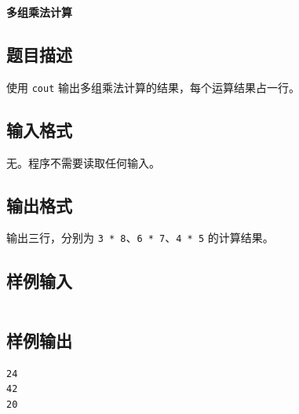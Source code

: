 \documentclass{article}
\newcommand{\problemname}[1]{\begin{center}\Large\bfseries #1\end{center}}
\begin{document}
\problemname{多组乘法计算}

\subsection*{题目描述}
使用 \texttt{cout} 输出多组乘法计算的结果，每个运算结果占一行。

\subsection*{输入格式}
无。程序不需要读取任何输入。

\subsection*{输出格式}
输出三行，分别为 \texttt{3 * 8}、\texttt{6 * 7}、\texttt{4 * 5} 的计算结果。

\subsection*{样例输入}
\begin{verbatim}

\end{verbatim}

\subsection*{样例输出}
\begin{verbatim}
24
42
20
\end{verbatim}
\end{document}

